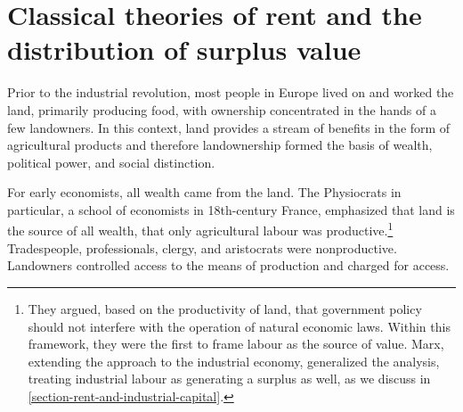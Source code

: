  

\section{Classical theories of rent and the distribution of surplus value}

Prior to the industrial revolution, most people in Europe lived on and worked the land, primarily producing food, with ownership concentrated in the hands of a few landowners. In this context, land provides a stream of benefits in the form of agricultural products and therefore landownership formed the basis of wealth, political power, and social distinction.  %

For early economists, %
all wealth came from the land. The Physiocrats in particular, a school of economists in 18th-century France, emphasized that land is the source of all wealth, that only agricultural labour was productive.\footnote{They argued, based on the productivity of land, that government policy should not interfere with the operation of natural economic laws. Within this framework, they were the first to frame labour as the source of value. Marx, extending the approach to the industrial economy, generalized the analysis, treating industrial labour as generating a surplus as well, as we discuss in \ref{section-rent-and-industrial-capital}.} Tradespeople, professionals, clergy, and aristocrats were nonproductive. Landowners controlled access to the means of production and charged for access. 

